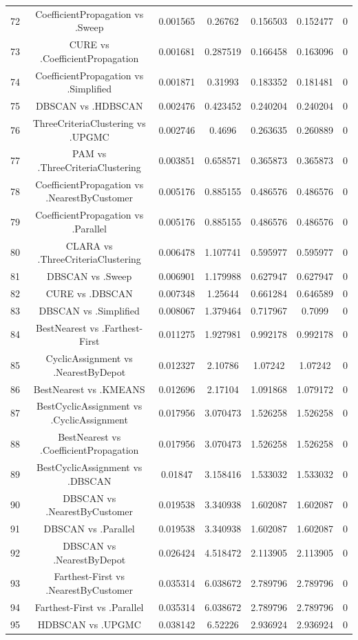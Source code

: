 \documentclass[a4paper,10pt]{article}
\begin{document}
\begin{landscape}
\begin{table}[!htp]
\begin{tabular}{ccccccc}
72&CoefficientPropagation vs .Sweep&0.001565&0.26762&0.156503&0.152477&0\\
73&CURE vs .CoefficientPropagation&0.001681&0.287519&0.166458&0.163096&0\\
74&CoefficientPropagation vs .Simplified&0.001871&0.31993&0.183352&0.181481&0\\
75&DBSCAN vs .HDBSCAN&0.002476&0.423452&0.240204&0.240204&0\\
76&ThreeCriteriaClustering vs .UPGMC&0.002746&0.4696&0.263635&0.260889&0\\
77&PAM vs .ThreeCriteriaClustering&0.003851&0.658571&0.365873&0.365873&0\\
78&CoefficientPropagation vs .NearestByCustomer&0.005176&0.885155&0.486576&0.486576&0\\
79&CoefficientPropagation vs .Parallel&0.005176&0.885155&0.486576&0.486576&0\\
80&CLARA vs .ThreeCriteriaClustering&0.006478&1.107741&0.595977&0.595977&0\\
81&DBSCAN vs .Sweep&0.006901&1.179988&0.627947&0.627947&0\\
82&CURE vs .DBSCAN&0.007348&1.25644&0.661284&0.646589&0\\
83&DBSCAN vs .Simplified&0.008067&1.379464&0.717967&0.7099&0\\
84&BestNearest vs .Farthest-First&0.011275&1.927981&0.992178&0.992178&0\\
85&CyclicAssignment vs .NearestByDepot&0.012327&2.10786&1.07242&1.07242&0\\
86&BestNearest vs .KMEANS&0.012696&2.17104&1.091868&1.079172&0\\
87&BestCyclicAssignment vs .CyclicAssignment&0.017956&3.070473&1.526258&1.526258&0\\
88&BestNearest vs .CoefficientPropagation&0.017956&3.070473&1.526258&1.526258&0\\
89&BestCyclicAssignment vs .DBSCAN&0.01847&3.158416&1.533032&1.533032&0\\
90&DBSCAN vs .NearestByCustomer&0.019538&3.340938&1.602087&1.602087&0\\
91&DBSCAN vs .Parallel&0.019538&3.340938&1.602087&1.602087&0\\
92&DBSCAN vs .NearestByDepot&0.026424&4.518472&2.113905&2.113905&0\\
93&Farthest-First vs .NearestByCustomer&0.035314&6.038672&2.789796&2.789796&0\\
94&Farthest-First vs .Parallel&0.035314&6.038672&2.789796&2.789796&0\\
95&HDBSCAN vs .UPGMC&0.038142&6.52226&2.936924&2.936924&0\\

\end{tabular}
\end{table}
\end{landscape}
\end{document}
